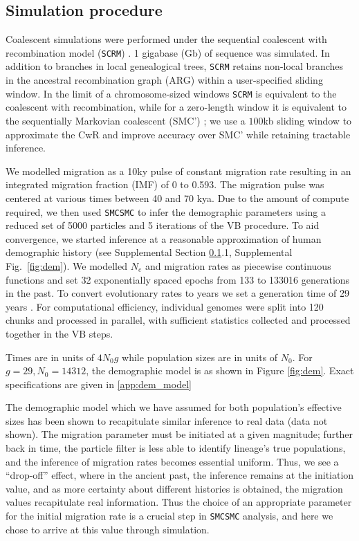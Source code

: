 \subsection{Simulation procedure} \label{simproc}

Coalescent simulations were performed under the sequential coalescent with recombination model ({\tt SCRM}) \cite{Staab2015}. 1 gigabase (Gb) of sequence was simulated.  In addition to branches in local genealogical trees, {\tt SCRM} retains non-local branches in the ancestral recombination graph (ARG) within a user-specified sliding window.  In the limit of a chromosome-sized windows {\tt SCRM} is equivalent to the coalescent with recombination, while for a zero-length window it is equivalent to the sequentially Markovian coalescent (SMC') \cite{McVean2005,Marjoram2006}; we use a $100$kb sliding window to approximate the CwR and improve accuracy over SMC' while retaining tractable inference.

We modelled migration as a 10ky pulse of constant migration rate resulting in an integrated migration fraction (IMF) of 0 to 0.593. The migration pulse was centered at various times between 40 and 70 kya.  Due to the amount of compute required, we then used {\tt SMCSMC} to infer the demographic parameters using a reduced set of 5000 particles and 5 iterations of the VB procedure. To aid convergence, we started inference at a reasonable approximation of human demographic history (see Supplemental Section \ref{simproc}.1, Supplemental Fig.\ \ref{fig:dem}). We modelled $N_e$ and migration rates as piecewise continuous functions and set 32 exponentially spaced epochs from 133 to 133016 generations in the past. To convert evolutionary rates to years we set a generation time of 29 years \cite{Fenner2005}.  For computational efficiency, individual genomes were split into 120 chunks and processed in parallel, with sufficient statistics collected and processed together in the VB steps.

Times are in units of $4N_0g$ while population sizes are in units of $N_0$. For $g=29, N_0 = 14312$, the demographic model is as shown in Figure \ref{fig:dem}.  Exact specifications are given in \ref{app:dem_model}

The demographic model which we have assumed for both population's effective sizes has been shown to recapitulate similar inference to real data (data not shown). The migration parameter must be initiated at a given magnitude; further back in time, the particle filter is less able to identify lineage's true populations, and the inference of migration rates becomes essential uniform. Thus, we see a ``drop-off'' effect, where in the ancient past, the inference remains at the initiation value, and as more certainty about different histories is obtained, the migration values recapitulate real information. Thus the choice of an appropriate parameter for the initial migration rate is a crucial step in {\tt SMCSMC} analysis, and here we chose to arrive at this value through simulation.

